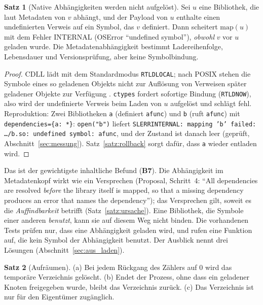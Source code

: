 \documentclass[a4paper,12pt,twoside]{report}
\DeclareRobustCommand{\_}{\ifmmode\mbox{\textunderscore}\else\textunderscore\allowbreak{}\fi}
\theoremstyle{definition}
\newtheorem{satz}{Satz}[chapter]
\newcommand{\Bf}[1]{\textbf{B#1}}
\begin{document}
\begin{satz}[Native Abhängigkeiten werden nicht aufgelöst]
	\label{satz:nativedep}
	Sei $u$ eine Bibliothek, die laut Metadaten von $v$ abhängt, und der Payload von $u$ enthalte einen undefinierten Verweis auf ein Symbol, das $v$ definiert. Dann scheitert $\mathrm{map}(u)$ mit dem Fehler INTERNAL (OSError ``undefined symbol''), \emph{obwohl} $v$ vor $u$ geladen wurde. Die Metadatenabhängigkeit bestimmt Ladereihenfolge, Lebensdauer und Versionsprüfung, aber keine Symbolbindung.
\end{satz}

\begin{proof}
	$\mathrm{CDLL}$ lädt mit dem Standardmodus \texttt{RTLD\_LOCAL}; nach POSIX stehen die Symbole eines so geladenen Objekts nicht zur Auflösung von Verweisen später geladener Objekte zur Verfügung \cite{posixdlopen}. \texttt{ctypes} fordert sofortige Bindung (\texttt{RTLD\_NOW}), also wird der undefinierte Verweis beim Laden von $u$ aufgelöst und schlägt fehl. Reproduktion: Zwei Bibliotheken \texttt{a} (definiert \texttt{a\_func}) und \texttt{b} (ruft \texttt{a\_func}) mit \texttt{dependencies=\{a: *\}}: \texttt{open("b")} liefert \texttt{SL\_ERR\_INTERNAL: mapping 'b' failed: \ldots/b.so: undefined symbol: a\_func}, und der Zustand ist danach leer (geprüft, Abschnitt~\ref{sec:messung}). Satz~\ref{satz:rollback} sorgt dafür, dass \texttt{a} wieder entladen wird.
\end{proof}

Das ist der gewichtigste inhaltliche Befund (\Bf{7}). Die Abhängigkeit im Metadatenkopf wirkt wie ein Versprechen (Proposal, Schritt~4: ``All dependencies are resolved \emph{before} the library itself is mapped, so that a missing dependency produces an error that names the dependency''); das Versprechen gilt, soweit es die \emph{Auffindbarkeit} betrifft (Satz~\ref{satz:ursache}). Eine Bibliothek, die Symbole einer anderen \emph{benutzt}, kann sie auf diesem Weg nicht binden. Die vorhandenen Tests prüfen nur, dass eine Abhängigkeit geladen wird, und rufen eine Funktion auf, die kein Symbol der Abhängigkeit benutzt. Der Ausblick nennt drei Lösungen (Abschnitt~\ref{sec:aus_laden}).

\begin{satz}[Aufräumen]
	\label{satz:aufraeumen}
	(a) Bei jedem Rückgang des Zählers auf $0$ wird das temporäre Verzeichnis gelöscht. (b) Endet der Prozess, ohne dass ein geladener Knoten freigegeben wurde, bleibt das Verzeichnis zurück. (c) Das Verzeichnis ist nur für den Eigentümer zugänglich.
\end{satz}
\end{document}
